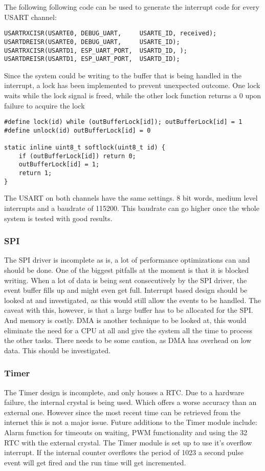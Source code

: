 The following following code can be used to generate the interrupt code for every USART channel:
\begin{verbatim}
USARTRXCISR(USARTE0, DEBUG_UART,     USARTE_ID, received);
USARTDREISR(USARTE0, DEBUG_UART,     USARTE_ID);
USARTRXCISR(USARTD1, ESP_UART_PORT,  USARTD_ID, );
USARTDREISR(USARTD1, ESP_UART_PORT,  USARTD_ID);
\end{verbatim}
Since the system could be writing to the buffer that is being handled in the interrupt, a lock has been implemented to prevent unexpected outcome. One lock waits while the lock signal is freed, while the other lock function returns a 0 upon failure to acquire the lock
\begin{verbatim}
#define lock(id) while (outBufferLock[id]); outBufferLock[id] = 1
#define unlock(id) outBufferLock[id] = 0

static inline uint8_t softlock(uint8_t id) {
	if (outBufferLock[id]) return 0;
	outBufferLock[id] = 1;
	return 1;
}
\end{verbatim}
The USART on both channels have the same settings. 8 bit words, medium level interrupts and a baudrate of 115200. This baudrate can go higher once the whole system is tested with good results.
\subsubsection{SPI}
The SPI driver is incomplete as is, a lot of performance optimizations can and should be done. One of the biggest pitfalls at the moment is that it is blocked writing. When a lot of data is being sent consecutively by the SPI driver, the event buffer fills up and might even get full. Interrupt based design should be looked at and investigated, as this would still allow the events to be handled. The caveat with this, however, is that a large buffer has to be allocated for the SPI. And memory is costly. DMA is another technique to be looked at, this would eliminate the need for a CPU at all and give the system all the time to process the other tasks. There needs to be some caution, as DMA has overhead on low data. This should be investigated.
\subsubsection{Timer}
The Timer design is incomplete, and only houses a RTC. Due to a hardware failure, the internal crystal is being used. Which offers a worse accuracy than an external one. However since the most recent time can be retrieved from the internet this is not a major issue. Future additions to the Timer module include: Alarm function for timeouts on waiting, PWM functionality and using the 32 RTC with the external crystal. The Timer module is set up to use it's overflow interrupt. If the internal counter overflows the period of 1023 a second pulse event will get fired and the run time will get incremented.

